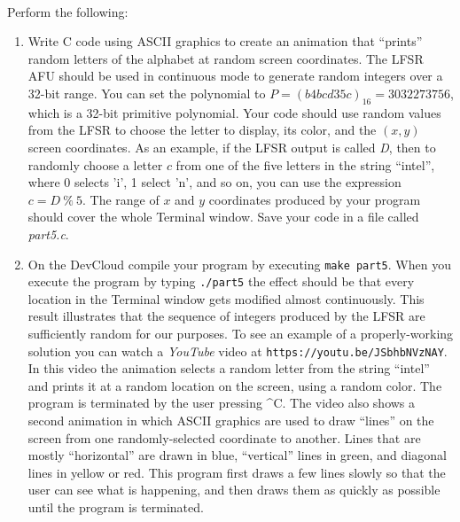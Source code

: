 \documentclass[epsfig,10pt,fullpage]{article}
\begin{document}
~\\
\noindent
Perform the following:
\begin{enumerate}
\item Write C code using ASCII graphics to create an animation that ``prints'' random 
letters of the alphabet at random screen coordinates. The LFSR AFU should be used in
continuous mode to generate random integers over a 32-bit range. You can set the polynomial 
to $P = (b4bcd35c)_{16} = 3032273756$, which is a 32-bit primitive polynomial. Your code
should use random values from the LFSR to choose the letter to display, its color, and 
the $(x,y)$ screen coordinates. As an example, if the LFSR output is called {\it D}, then 
to randomly choose a letter $c$ from one of the five letters in the string ``intel'',
where 0 selects 'i', 1 select 'n', and so on, you can use the expression $c = D~\%~5$. 
The range of $x$ and $y$ coordinates produced by your program should cover 
the whole Terminal window.  Save your code in a file called {\it part5.c}.

\item
On the DevCloud compile your program by executing \texttt{make part5}. When you execute
the program by typing \texttt{./part5} the effect should be that every location in the Terminal 
window gets modified almost continuously. This result illustrates that the sequence of integers 
produced by the LFSR are sufficiently random for our purposes. To see an example of a
properly-working solution you can watch a {\it YouTube} video at
\texttt{https://youtu.be/JSbhbNVzNAY}. In this video the
animation selects a random letter from the string ``intel'' and prints it at a random
location on the screen, using a random color. The program is terminated by the user
pressing \^{}C. The video also shows a second animation in which ASCII graphics are used
to draw ``lines'' on the screen from one randomly-selected coordinate to another.
Lines that are mostly ``horizontal'' are drawn in blue, ``vertical'' lines in green, and 
diagonal lines in yellow or red. This program first draws a few lines slowly so that the 
user can see what is
happening, and then draws them as quickly as possible until the program is terminated.
\end{enumerate}
\end{document}
